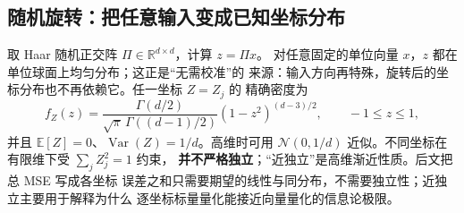 \subsection{随机旋转：把任意输入变成已知坐标分布}

取 Haar 随机正交阵 $\Pi\in\mathbb R^{d\times d}$，计算 $z=\Pi x$。
对任意固定的单位向量 $x$，$z$ 都在单位球面上均匀分布；这正是“无需校准”的
来源：输入方向再特殊，旋转后的坐标分布也不再依赖它。任一坐标 $Z=Z_j$ 的
精确密度为
\begin{equation}
  f_Z(z)=\frac{\Gamma(d/2)}{\sqrt\pi\,\Gamma((d-1)/2)}
  (1-z^2)^{(d-3)/2},\qquad -1\le z\le1,
  \label{eq:38-tq-beta}
\end{equation}
并且 $\mathbb E[Z]=0$、$\operatorname{Var}(Z)=1/d$。高维时可用
$\mathcal N(0,1/d)$ 近似。不同坐标在有限维下受 $\sum_jZ_j^2=1$ 约束，
\textbf{并不严格独立}；“近独立”是高维渐近性质。后文把总 MSE 写成各坐标
误差之和只需要期望的线性与同分布，不需要独立性；近独立主要用于解释为什么
逐坐标标量量化能接近向量量化的信息论极限。

